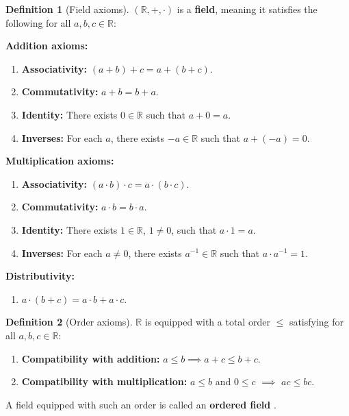 \documentclass[12pt,a4paper,openany]{book}
\newcommand{\R}{\mathbb{R}}
\theoremstyle{definition}
\newtheorem{definition}{Definition}[chapter]
\theoremstyle{remark}
\begin{document}
\begin{definition}[Field axioms]\label{def:field-axioms}
$(\R, +, \cdot)$ is a \textbf{field}, meaning it satisfies the following
for all $a,b,c \in \R$:

\medskip
\textbf{Addition axioms:}
\begin{enumerate}[label=(A\arabic*)]
  \item \textbf{Associativity:} $(a+b)+c = a+(b+c)$.
  \item \textbf{Commutativity:} $a+b = b+a$.
  \item \textbf{Identity:} There exists $0 \in \R$ such that $a+0=a$.
  \item \textbf{Inverses:} For each $a$, there exists $-a \in \R$ such that
    $a+(-a)=0$.
\end{enumerate}

\textbf{Multiplication axioms:}
\begin{enumerate}[label=(M\arabic*)]
  \item \textbf{Associativity:} $(a \cdot b)\cdot c = a \cdot (b \cdot c)$.
  \item \textbf{Commutativity:} $a \cdot b = b \cdot a$.
  \item \textbf{Identity:} There exists $1 \in \R$, $1 \neq 0$, such that
    $a \cdot 1 = a$.
  \item \textbf{Inverses:} For each $a \neq 0$, there exists $a^{-1} \in \R$
    such that $a \cdot a^{-1} = 1$.
\end{enumerate}

\textbf{Distributivity:}
\begin{enumerate}[label=(D)]
  \item $a \cdot (b+c) = a\cdot b + a \cdot c$.
\end{enumerate}
\end{definition}

\begin{definition}[Order axioms]\label{def:order-axioms}
$\R$ is equipped with a total order $\leq$ satisfying for all $a,b,c \in \R$:
\begin{enumerate}[label=(O\arabic*)]
  \item \textbf{Compatibility with addition:} $a \leq b \implies a+c \leq b+c$.
  \item \textbf{Compatibility with multiplication:} $a \leq b$ and $0 \leq c$
    $\implies$ $ac \leq bc$.
\end{enumerate}
A field equipped with such an order is called an \textbf{ordered field}%
.
\end{definition}
\end{document}
